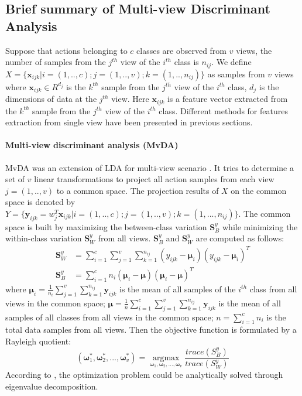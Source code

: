 
\subsection{Brief summary of Multi-view Discriminant Analysis}
    Suppose that actions belonging to $c$ classes are observed from $v$ views, the number of samples from the $j^{th}$ view of the $i^{th}$ class is $n_{ij}$. We define $X = \{\boldsymbol{x}_{ijk}|i=(1,..,c);j = (1,..,v);k=(1,..,n_{ij})\}$ as samples from $v$ views where 
    $\boldsymbol{x}_{ijk} \in R^{d_j}$ is the $k^{th}$ sample from the $j^{th}$ view of the $i^{th}$ class, $d_j$ is the dimensions of data at the $j^{th}$ view. Here ${\boldsymbol x}_{ijk}$ is a feature vector extracted from the $k^{th}$ sample from the $j^{th}$ view of the $i^{th}$ class. Different methods for features extraction from single view have been presented in previous sections. 

    \paragraph{Multi-view discriminant analysis (MvDA)}
    MvDA was an extension of LDA for multi-view scenario \cite{kan2015multi}. It tries to determine a set of $v$ linear transformations to project all action samples from each view $j = (1,..,v)$ to a common space. The projection results of $X$ on the common space is denoted by $Y = \{\boldsymbol{y}_{ijk} = w_j^T\boldsymbol{x}_{ijk}|i=(1,..,c); j=(1,..,v); k=(1,...,n_{ij})\}$. The common space is built by maximizing the between-class variation $\boldsymbol{S}_B^y$ while minimizing the within-class variation $\boldsymbol{S}_W^y$ from all views. $\boldsymbol{S}_B^y$ and $\boldsymbol{S}_W^y$ are computed as follows: 
    \begin{align}
        \boldsymbol{S}_W^y &= \sum_{i=1}^{c}\sum_{j=1}^{v}\sum_{k=1}^{n_{ij}}(y_{ijk}-\boldsymbol{\mu}_i)(y_{ijk}-\boldsymbol{\mu}_i)^T \label{eq:MvDA_Sw}\\
        \boldsymbol{S}_B^y &= \sum_{i=1}^{c}n_i(\boldsymbol{\mu}_i - \boldsymbol{\mu})(\boldsymbol{\mu}_i - \boldsymbol{\mu})^T \label{eq:MvDA_Sb}
    \end{align}
    where $\boldsymbol{\mu}_i=\frac{1}{n_i}\sum_{j=1}^{v}{\sum_{k=1}^{n_{ij}}}{\boldsymbol{y}_{ijk}}$ is the mean of all samples of the $i^{th}$ class from all views in the common space; $\boldsymbol{\mu}=\frac{1}{n}\sum_{i=1}^{c}\sum_{j=1}^{v}{\sum_{k=1}^{n_{ij}}{\boldsymbol{y}_{ijk}}}$ is the mean of all samples of all classes from all views in the common space; $n=\sum_{i=1}^{c}n_i$ is the total data samples from all views.
    Then the objective function is formulated by a Rayleigh quotient:
    \begin{equation}
        (\boldsymbol{\omega}_1^*,\boldsymbol{\omega}_2^*, ..., \boldsymbol{\omega}_v^*) = \operatorname*{argmax}_{\boldsymbol{\omega}_1, \boldsymbol{\omega}_2,..., \boldsymbol{\omega}_v}\frac{trace({S}_B^y)}{trace({S}_W^y)}
        \label{eq:MvDA}
    \end{equation}
    According to \cite{kan2016multi}, the optimization problem could be analytically solved through eigenvalue decomposition. 

